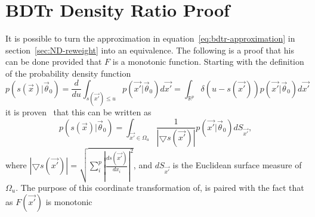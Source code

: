 \chapter{BDTr Density Ratio Proof}
\label{app:bdtr-proof}

It is possible to turn the approximation in equation~\ref{eq:bdtr-approximation}
in section~\ref{sec:ND-reweight} into an equivalence. The following is a proof
that his can be done provided that $F$ is a monotonic function. Starting with
the definition of the probability density function
\begin{equation}
  p(s(\vec{x}) | \vec{\theta}_{0}) = \frac{d}{du} \int_{s(\vec{x'}) \leq u} p(\vec{x'} | \vec{\theta}_{0}) d\vec{x'}
  =  \int_{\mathbb{R}^{p}} \delta (u-s(\vec{x'})) p(\vec{x'} | \vec{\theta}_{0}) d\vec{x'}
\end{equation}
it is proven~\cite{Hormander1990} that this can be written as
\begin{equation}
  p(s(\vec{x}) | \vec{\theta}_{0}) = \int_{\vec{x'} \in \Omega_{u}} \frac{1}{|\bigtriangledown s(\vec{x'})|} p(\vec{x'} | \vec{\theta}_{0}) dS_{\vec{x'}},
  \label{eq:CordTransPDF}
\end{equation}
where $|\bigtriangledown s(\vec{x'})| = \sqrt{\sum^{p}_{i}
  |\frac{ds(\vec{x'})}{dx_{i}}|^{2}}$, and $dS_{\vec{x'}}$ is the
Euclidean surface measure of $\Omega_{u}$. The purpose of this coordinate
transformation of, is paired with the fact that as $F(\vec{x'})$ is
monotonic

